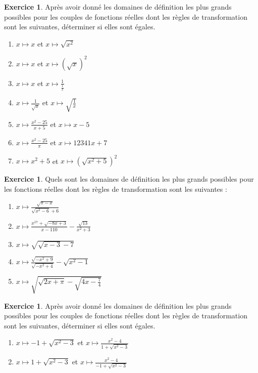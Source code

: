 \documentclass[a4paper,13pt]{scrreprt}
\theoremstyle{plain}
\theoremstyle{definition}
\newtheorem{exo}[subsection]{Exercice}
\begin{document}
\begin{exo} \label{exof5}
	Après avoir donné les domaines de définition les plus grands possibles pour les couples de fonctions réelles dont les règles de transformation sont les suivantes, déterminer si elles sont égales.
	\begin{enumerate}
		\item $x \mapsto x$ et $x \mapsto \sqrt{x^2}$\\
		\item $x \mapsto x$ et $x \mapsto (\sqrt{x})^{2}$\\
		\item $x \mapsto x$ et $x \mapsto \frac{1}{\frac{1}{x}}$\\
		\item $x \mapsto \frac{1}{\sqrt{x}}$ et $x \mapsto \sqrt{\frac{1}{x}}$\\
		\item $x \mapsto \frac{x^2 - 25}{x+5}$ et $x \mapsto x-5$\\
		\item $x \mapsto \frac{x^2 - 25}{\pi}$ et $x \mapsto 12341x + 7$\\
		\item $x \mapsto x^2 + 5$ et $x \mapsto (\sqrt{x^2+5})^2$\\
	\end{enumerate}
\end{exo}

\begin{exo} \label{exof6}
	Quels sont les domaines de définition les plus grands possibles pour les fonctions réelles dont les règles de transformation sont les suivantes :
	\begin{enumerate}
		\item $x \mapsto \frac{\sqrt{\pi-x}}{\sqrt{x^2-6}+6}$ \\
		\item $x \mapsto \frac{x^{17} + \sqrt{-8x+3}}{x-110}-\frac{\sqrt{13}}{x^2 +3}$ \\
		\item $x \mapsto \sqrt{\sqrt{x-3}-7}$ \\
		\item $x \mapsto \frac{\sqrt{-x^2+9}}{\sqrt{-x^2+4}}-\sqrt{x^2-1}$ \\
		\item $x \mapsto \sqrt{\sqrt{2x+\pi} - \sqrt{4x-\frac{7}{4}}}$	
	\end{enumerate}
\end{exo}

\begin{exo} \label{exof7}
	Après avoir donné les domaines de définition les plus grands possibles pour les couples de fonctions réelles dont les règles de transformation sont les suivantes, déterminer si elles sont égales.
	\begin{enumerate}
		\item $x \mapsto -1 + \sqrt{x^2 - 3}$ et $x \mapsto \frac{x^2-4}{1 + \sqrt{x^2-3}}$\\
		\item $x \mapsto 1 + \sqrt{x^2 - 3}$ et $x \mapsto \frac{x^2-4}{-1 + \sqrt{x^2-3}}$\\
	\end{enumerate}
\end{exo}
\end{document}
